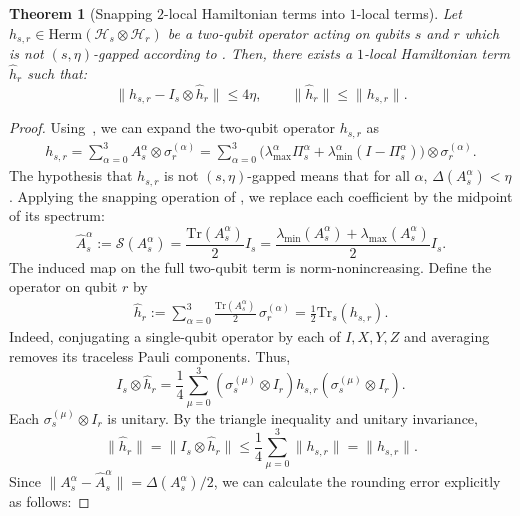 \documentclass[a4paper,onecolumn,11pt]{quantumarticle}
\theoremstyle{plain}
\newtheorem{theorem}{Theorem}[section]
\begin{document}
\begin{theorem}[Snapping $2$-local Hamiltonian terms into $1$-local terms]
\label{thm:snapping-2-local-hamiltonian-term}
   Let $h_{s,r} \in \mathrm{Herm}(\mathcal{H}_s \otimes \mathcal{H}_r)$ be a two-qubit operator acting on qubits $s$ and $r$ which is not $(s,\eta)$-gapped according to . Then, there exists a $1$-local Hamiltonian term $\hat{h}_{r}$ such that:
    \begin{equation}
    \label{eqn:snapped-distance-between-hamiltonian-terms}
        \|h_{s,r} - I_s\otimes\hat{h}_{r}\| \leq 4 \eta, \qquad \|\hat{h}_{r}\| \leq \|h_{s,r}\|.
    \end{equation}
\end{theorem}
\begin{proof}
Using~, we can expand the two-qubit operator $h_{s,r}$ as
    \begin{align*}
        h_{s,r} = \sum\limits_{\alpha = 0}^{3} A_{s}^{\alpha} \otimes \sigma_{r}^{(\alpha)}
        = \sum\limits_{\alpha = 0}^{3} \Big(\lambda_{\max}^{\alpha} \Pi_{s}^{\alpha} + \lambda_{\min}^{\alpha} \left(I - \Pi_{s}^{\alpha}\right)\Big) \otimes \sigma_{r}^{(\alpha)}.
    \end{align*}
The hypothesis that $h_{s,r}$ is not $(s,\eta)$-gapped means that for all $\alpha$, $\Delta(A_{s}^{\alpha}) < \eta$. Applying the snapping operation of , we replace each coefficient by the midpoint of its spectrum:
\[
\hat{A}_s^{\alpha} := \mathcal{S}(A_s^{\alpha}) = \frac{\mathrm{Tr}(A_s^{\alpha})}{2}I_s
= \frac{\lambda_{\min}(A_s^{\alpha})+\lambda_{\max}(A_s^{\alpha})}{2}I_s.
\]
The induced map on the full two-qubit term is norm-nonincreasing. Define the operator on qubit $r$ by
\begin{align}
    \hat{h}_r := \sum\limits_{\alpha = 0}^{3} \frac{\mathrm{Tr}(A_s^{\alpha})}{2}\,\sigma_r^{(\alpha)}
    = \frac{1}{2}\mathrm{Tr}_s(h_{s,r}).
\end{align}
Indeed, conjugating a single-qubit operator by each of $I,X,Y,Z$ and averaging removes its traceless Pauli components. Thus,
\[
I_s\otimes\hat{h}_r
= \frac{1}{4}\sum_{\mu=0}^{3}(\sigma_s^{(\mu)}\otimes I_r)h_{s,r}(\sigma_s^{(\mu)}\otimes I_r).
\]
Each $\sigma_s^{(\mu)}\otimes I_r$ is unitary. By the triangle inequality and unitary invariance,
\[
\|\hat{h}_r\|=\|I_s\otimes\hat{h}_r\|
\leq\frac14\sum_{\mu=0}^{3}\|h_{s,r}\|=\|h_{s,r}\|.
\] Since $\|A_s^{\alpha}-\hat{A}_s^{\alpha}\|=\Delta(A_s^{\alpha})/2$, we can calculate the rounding error explicitly as follows:

\end{proof}
\end{document}
